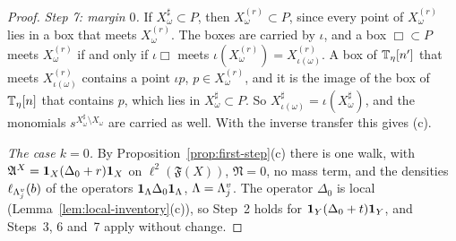 \begin{proof}
\emph{Step 7: margin $0$.} If $X^\sharp_\omega\subset P$, then $X_\omega^{(r)}\subset P$, since every point of $X_\omega^{(r)}$ lies in a box that meets $X_\omega^{(r)}$. The boxes are carried by $\iota$, and a box $\Box\subset P$ meets $X_\omega^{(r)}$ if and only if $\iota\Box$ meets $\iota(X_\omega^{(r)})=X_{\iota(\omega)}^{(r)}$. A box of $\mathbb T_\eta[n']$ that meets $X_{\iota(\omega)}^{(r)}$ contains a point $\iota p$, $p\in X^{(r)}_\omega$, and it is the image of the box of $\mathbb T_\eta[n]$ that contains $p$, which lies in $X^\sharp_\omega\subset P$. So $X^\sharp_{\iota(\omega)}=\iota(X^\sharp_\omega)$, and the monomials $s^{X^\sharp_\omega\setminus X_\omega}$ are carried as well. With the inverse transfer this gives (c).

\emph{The case $k=0$.} By Proposition~\ref{prop:first-step}(c) there is one walk, with $\mathfrak A^X=\mathbf 1_X(\Delta_0+r)\mathbf 1_X$ on $\ell^2(\mathfrak F(X))$, $\mathfrak N=0$, no mass term, and the densities $\ell_{\Lambda^v_j}(b)$ of the operators $\mathbf 1_\Lambda\Delta_0\mathbf 1_\Lambda$, $\Lambda=\Lambda^v_j$. The operator $\Delta_0$ is local (Lemma~\ref{lem:local-inventory}(c)), so Step~2 holds for $\mathbf 1_Y(\Delta_0+t)\mathbf 1_Y$, and Steps~3, 6 and~7 apply without change.
\end{proof}

